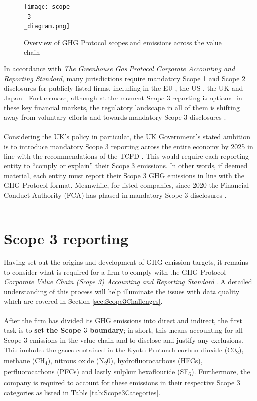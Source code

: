 \documentclass[12pt,twoside]{report}
\newcommand\fnote[1]{\captionsetup{font=scriptsize, justification=raggedright, singlelinecheck=false}\subcaption*{\textit{#1}}}
\begin{document}
\begin{figure}[H]
	\centering
	\caption{Overview of GHG Protocol scopes and emissions across the value chain}
	\label{fig:Scope3Diagram}
	\texttt{[image: scope\\\_3\\\_diagram.png]}
	\fnote{Source: \cite{ghgscope32013}, p.6}
\end{figure}

In accordance with \textit{The Greenhouse Gas Protocol Corporate Accounting and Reporting Standard}, many jurisdictions require mandatory Scope 1 and Scope 2 disclosures for publicly listed firms, including in the EU \cite{eu20232772}, the US \cite{sec2024}, the UK \cite{ukleg2018} and Japan \cite{fsa2022}. Furthermore, although at the moment Scope 3 reporting is optional in these key financial markets, the regulatory landscape in all of them is shifting away from voluntary efforts and towards mandatory Scope 3 disclosures \cite{ftserussell2024}. 
\\ \\
Considering the UK's policy in particular, the UK Government's stated ambition is to introduce mandatory Scope 3 reporting across the entire economy by 2025 in line with the recommendations of the TCFD \cite{ukgov2020}. This would require each reporting entity to ``comply or explain'' their Scope 3 emissions. In other words, if deemed material, each entity must report their Scope 3 GHG emissions in line with the GHG Protocol format. Meanwhile, for listed companies, since 2020 the Financial Conduct Authority (FCA) has phased in mandatory Scope 3 disclosures \cite{fca2020, fca2021}. 
\\ \\
\section{Scope 3 reporting} \label{sec:Scope3Reporting}
Having set out the origins and development of GHG emission targets, it remains to consider what is required for a firm to comply with the GHG Protocol \textit{Corporate Value Chain (Scope 3) Accounting and Reporting Standard} \cite{ghgscope32013}. A detailed understanding of this process will help illuminate the issues with data quality which are covered in Section \ref{sec:Scope3Challenges}.
\\ \\
After the firm has divided its GHG emissions into direct and indirect, the first task is to \textbf{set the Scope 3 boundary}; in short, this means accounting for all Scope 3 emissions in the value chain and to disclose and justify any exclusions. This includes the gases contained in the Kyoto Protocol: carbon dioxide (C0\textsubscript{2}), methane (CH\textsubscript{4}), nitrous oxide (N\textsubscript{2}0), hydrofluorocarbons (HFCs), perfluorocarbons (PFCs) and lastly sulphur hexaflouride (SF\textsubscript{6}). Furthermore, the company is required to account for these emissions in their respective Scope 3 categories as listed in Table \ref{tab:Scope3Categories}. 
\end{document}
